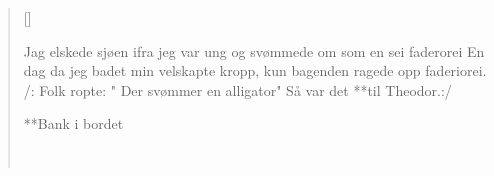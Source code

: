 \settowidth{\versewidth}{Lag elskede sjøen ifra jag var ung}



\begin{verse}[\versewidth]



Jag elskede sjøen ifra jeg var ung\*
og svømmede om som en sei\*
faderorei\*
En dag da jeg badet min velskapte kropp,\*
kun bagenden ragede opp\*
faderiorei.\*
/: Folk ropte: " Der svømmer en alligator"\*
Så var det **til Theodor.:/\!

\flagverse{}
**Bank i bordet\!


\
\end{verse}

